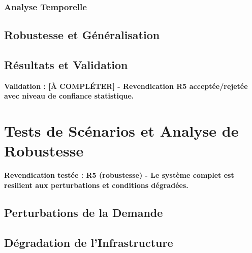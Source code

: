\subsubsection{Analyse Temporelle}

\subsection{Robustesse et Généralisation}
\label{subsec:robustesse_generalisation}

\subsection{Résultats et Validation}
\label{subsec:resultats_entrainement}

\textbf{Validation : [À COMPLÉTER] - Revendication R5 acceptée/rejetée avec niveau de confiance statistique.}

\section{Tests de Scénarios et Analyse de Robustesse}
\label{sec:tests_scenarios}

\textbf{Revendication testée : R5 (robustesse) - Le système complet est resilient aux perturbations et conditions dégradées.}

\subsection{Perturbations de la Demande}
\label{subsec:perturbations_demande}

\subsection{Dégradation de l'Infrastructure}
\label{subsec:degradation_infra}


